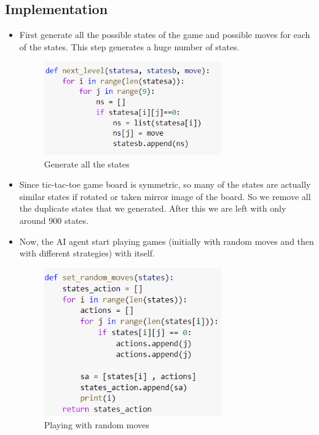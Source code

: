 \documentclass[journal, compsoc]{IEEEtran}
\begin{document}
\subsection{Implementation}
\begin{itemize}
\item First generate all the possible states of the game and possible moves for each of the states. This step generates a huge number of states.

\begin{figure}[!h]
\centering
\includegraphics[width=3in]{images/states_generator.PNG}
\caption{Generate all the states}
\label{fig_sim}
\end{figure}

\item Since tic-tac-toe game board is symmetric, so many of the states are actually similar states if rotated or taken mirror image of the board. So we remove all the duplicate states that we generated. After this we are left with only around 900 states.

\item Now, the AI agent start playing games (initially with random moves and then with different strategies) with itself. 

\begin{figure}[!h]
\centering
\includegraphics[width=3in]{images/Random_moves.PNG}
\caption{Playing with random moves}
\label{fig_sim}
\end{figure}


\end{itemize}
\end{document}

